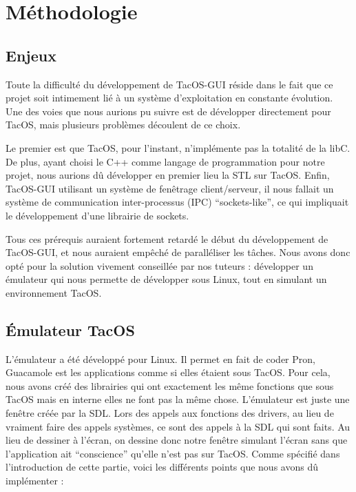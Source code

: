 \section{Méthodologie}

\subsection{Enjeux}

Toute la difficulté du développement de TacOS-GUI réside dans le fait que ce projet soit intimement lié à un système d'exploitation en constante évolution.
Une des voies que nous aurions pu suivre est de développer directement pour TacOS, mais plusieurs problèmes découlent de ce choix.

Le premier est que TacOS, pour l'instant, n'implémente pas la totalité de la libC.
De plus, ayant choisi le C++ comme langage de programmation pour notre projet, nous aurions dû développer en premier lieu la STL sur TacOS.
Enfin, TacOS-GUI utilisant un système de fenêtrage client/serveur, il nous fallait un système de communication inter-processus (IPC) ``sockets-like'', ce qui impliquait le développement d'une librairie de sockets.

Tous ces prérequis auraient fortement retardé le début du développement de TacOS-GUI, et nous auraient empêché de paralléliser les tâches.
Nous avons donc opté pour la solution vivement conseillée par nos tuteurs : développer un émulateur qui nous permette de développer sous Linux, tout en simulant un environnement TacOS.

\subsection{Émulateur TacOS}

L'émulateur a été développé pour Linux.
Il permet en fait de coder Pron, Guacamole est les applications comme si elles étaient sous TacOS.
Pour cela, nous avons créé des librairies qui ont exactement les même fonctions que sous TacOS mais en interne elles ne font pas la même chose.
L'émulateur est juste une fenêtre créée par la SDL.
Lors des appels aux fonctions des drivers, au lieu de vraiment faire des appels systèmes, ce sont des appels à la SDL qui sont faits.
Au lieu de dessiner à l'écran, on dessine donc notre fenêtre simulant l'écran sans que l'application ait ``conscience'' qu'elle n'est pas sur TacOS.
Comme spécifié dans l'introduction de cette partie, voici les différents points que nous avons dû implémenter :

